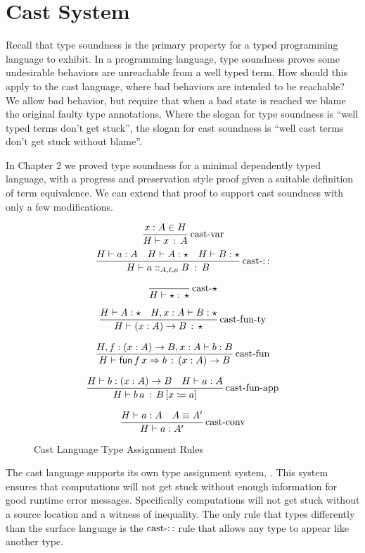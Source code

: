 \section{Cast System}

Recall that type soundness is the primary property for a typed programming language to exhibit.
In a programming language, type soundness proves some undesirable behaviors are unreachable from a well typed term.
How should this apply to the cast language, where bad behaviors are intended to be reachable?
We allow bad behavior, but require that when a bad state is reached we blame the original faulty type annotations.
Where the slogan for type soundness is ``well typed terms don't get stuck'', the slogan for cast soundness is ``well cast terms don't get stuck without blame''.

In Chapter 2 we proved type soundness for a minimal dependently typed language, with a progress and preservation style proof given a suitable definition of term equivalence.
We can extend that proof to support cast soundness with only a few modifications.

\begin{figure}
\[
\frac{x:A\in H}{H\vdash x\,:\,A}
\operatorname{cast-var}
\]
\[
\frac{H\vdash a:A\quad H\vdash A:\star\quad H\vdash B:\star}{H\vdash a::_{A,\ell,o}B\::\:B}
\operatorname{cast-::}
\]

\[
\frac{\,}{H\vdash\star:\,\star}
\operatorname{cast-\star}
\]

\[
\frac{H\vdash A:\star\quad H,x:A\vdash B:\star}{H\vdash\left(x:A\right)\rightarrow B\,:\,\star}
\operatorname{cast-fun-ty}
\]

\[
\frac{H,f:\left(x:A\right)\rightarrow B,x:A\vdash b:B}{H\vdash\mathsf{fun}\,f\,x\Rightarrow b\,:\,\left(x:A\right)\rightarrow B}
\operatorname{cast-fun}
\]

\[
\frac{H\vdash b:\left(x:A\right)\rightarrow B\quad H\vdash a:A}{H\vdash b\,a\,:\,B\left[x\coloneqq a\right]}
\operatorname{cast-fun-app}
\]

\[
\frac{H\vdash a:A\quad A\equiv A'}{H\vdash a:A'}
\operatorname{cast-conv}
\]


\caption{Cast Language Type Assignment Rules}
\label{fig:cast-tas-rules}
\end{figure}

The cast language supports its own type assignment system, .
This system ensures that computations will not get stuck without enough information for good runtime error messages.
Specifically computations will not get stuck without a source location and a witness of inequality.
The only rule that types differently than the surface language is the $\operatorname{cast-::}$ rule that allows any type to appear like another type. 

